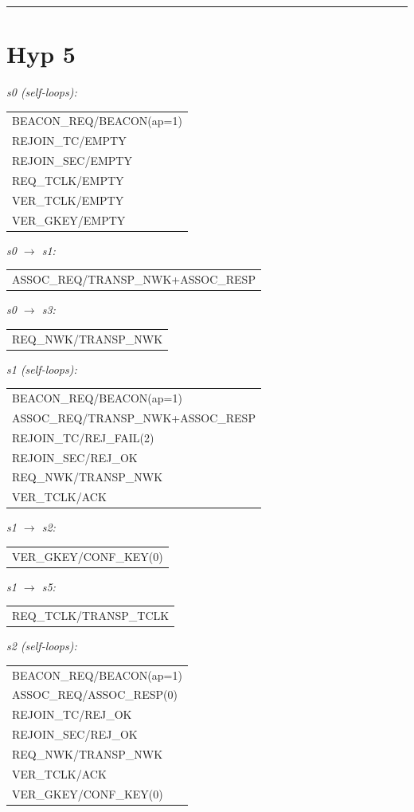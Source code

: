 \documentclass[10pt]{article}
\makeatletter
\newcommand{\iolist}[1]{%
  \ttfamily\small
  \begin{tabular}{@{}l@{}}
  #1
  \end{tabular}%
  \rmfamily
}
\makeatother
\begin{document}
\bigskip\hrule

\section*{Hyp 5}

\noindent\textit{s0 (self-loops):}\\[2pt]
\iolist{%
BEACON\_REQ/BEACON(ap=1)\\
REJOIN\_TC/EMPTY\\
REJOIN\_SEC/EMPTY\\
REQ\_TCLK/EMPTY\\
VER\_TCLK/EMPTY\\
VER\_GKEY/EMPTY\\
}

\medskip
\noindent\textit{s0 $\to$ s1:}\\[2pt]
\iolist{%
ASSOC\_REQ/TRANSP\_NWK+ASSOC\_RESP\\
}

\medskip
\noindent\textit{s0 $\to$ s3:}\\[2pt]
\iolist{%
REQ\_NWK/TRANSP\_NWK\\
}

\medskip
\noindent\textit{s1 (self-loops):}\\[2pt]
\iolist{%
BEACON\_REQ/BEACON(ap=1)\\
ASSOC\_REQ/TRANSP\_NWK+ASSOC\_RESP\\
REJOIN\_TC/REJ\_FAIL(2)\\
REJOIN\_SEC/REJ\_OK\\
REQ\_NWK/TRANSP\_NWK\\
VER\_TCLK/ACK\\
}

\medskip
\noindent\textit{s1 $\to$ s2:}\\[2pt]
\iolist{%
VER\_GKEY/CONF\_KEY(0)\\
}

\medskip
\noindent\textit{s1 $\to$ s5:}\\[2pt]
\iolist{%
REQ\_TCLK/TRANSP\_TCLK\\
}

\medskip
\noindent\textit{s2 (self-loops):}\\[2pt]
\iolist{%
BEACON\_REQ/BEACON(ap=1)\\
ASSOC\_REQ/ASSOC\_RESP(0)\\
REJOIN\_TC/REJ\_OK\\
REJOIN\_SEC/REJ\_OK\\
REQ\_NWK/TRANSP\_NWK\\
VER\_TCLK/ACK\\
VER\_GKEY/CONF\_KEY(0)\\
}
\end{document}
